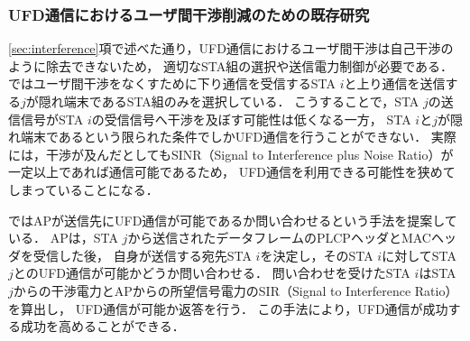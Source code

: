 \documentclass[master]{kuisthesis}		%
\begin{document}
		\subsubsection{UFD通信におけるユーザ間干渉削減のための既存研究}\label{sec:ufd_pairing}
			\ref{sec:interference}項で述べた通り，UFD通信におけるユーザ間干渉は自己干渉のように除去できないため，
			適切なSTA組の選択や送信電力制御が必要である．
			\cite{fdmac3}ではユーザ間干渉をなくすために下り通信を受信するSTA $i$と上り通信を送信する$j$が隠れ端末であるSTA組のみを選択している．
			こうすることで，STA $j$の送信信号がSTA $i$の受信信号へ干渉を及ぼす可能性は低くなる一方，
			STA $i$と$j$が隠れ端末であるという限られた条件でしかUFD通信を行うことができない．
			実際には，干渉が及んだとしてもSINR（Signal to Interference plus Noise Ratio）が一定以上であれば通信可能であるため，
			UFD通信を利用できる可能性を狭めてしまっていることになる．
			\par
			\cite{goyal}ではAPが送信先にUFD通信が可能であるか問い合わせるという手法を提案している．
			APは，STA $j$から送信されたデータフレームのPLCPヘッダとMACヘッダを受信した後，
			自身が送信する宛先STA $i$を決定し，そのSTA $i$に対してSTA $j$とのUFD通信が可能かどうか問い合わせる．
			問い合わせを受けたSTA $i$はSTA $j$からの干渉電力とAPからの所望信号電力のSIR（Signal to Interference Ratio）を算出し，
			UFD通信が可能か返答を行う．
			この手法により，UFD通信が成功する成功を高めることができる．
\end{document}
